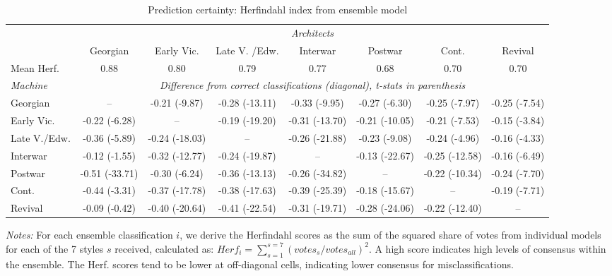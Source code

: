 \documentclass[]{article}
\begin{document}
\begin{table}[!htb] 
\caption{Prediction certainty: Herfindahl index from ensemble model} 
\label{tab:herftab} 
\footnotesize
\begin{tabular}{lccccccc}
\toprule 
  & \multicolumn{7}{c}{\emph{Architects}} \\ 
  \cmidrule(lr){2-8} 
& Georgian &  Early Vic. & Late V. /Edw. & Interwar & Postwar & Cont. & Revival \\  

Mean Herf. & 0.88 &  0.80 & 0.79 & 0.77 & 0.68 &  0.70 &  0.70 \\  
 \midrule 
\emph{Machine} & \multicolumn{7}{c}{\emph{Difference from correct classifications (diagonal), t-stats in parenthesis}} \\
\cmidrule(lr){2-8} 
Georgian & -- & -0.21 (-9.87) & -0.28 (-13.11) & -0.33 (-9.95) & -0.27 (-6.30) & -0.25 (-7.97) & -0.25 (-7.54) \\
 Early Vic. & -0.22 (-6.28) &  -- & -0.19 (-19.20) & -0.31 (-13.70) & -0.21 (-10.05) & -0.21 (-7.53) & -0.15 (-3.84) \\
 Late V./Edw. & -0.36 (-5.89) & -0.24 (-18.03) &  -- & -0.26 (-21.88) & -0.23 (-9.08) & -0.24 (-4.96) & -0.16 (-4.33) \\
 Interwar & -0.12 (-1.55) & -0.32 (-12.77) & -0.24 (-19.87) &  -- & -0.13 (-22.67) & -0.25 (-12.58) & -0.16 (-6.49) \\
 Postwar & -0.51 (-33.71) & -0.30 (-6.24) & -0.36 (-13.13) & -0.26 (-34.82) & -- & -0.22 (-10.34) & -0.24 (-7.70) \\
 Cont. & -0.44 (-3.31) & -0.37 (-17.78) & -0.38 (-17.63) & -0.39 (-25.39) & -0.18 (-15.67) & -- & -0.19 (-7.71) \\
 Revival & -0.09 (-0.42) & -0.40 (-20.64) & -0.41 (-22.54) & -0.31 (-19.71) & -0.28 (-24.06) & -0.22 (-12.40) &  -- \\
\bottomrule 
\end{tabular}
\begin{minipage}{\textwidth}
\vspace{0.25cm}
\footnotesize \emph{Notes:} For each ensemble classification $i$, we derive the Herfindahl scores as the sum of the squared share of votes from individual models for each of the 7 styles $s$ received, calculated as: $Herf_i=\sum_{s=1}^{s=7} (votes_s/votes_{all})^2$. A high score indicates high levels of consensus within the ensemble. The Herf. scores tend to be lower at off-diagonal cells, indicating lower consensus for misclassifications.
\end{minipage}
\end{table}
\end{document}
